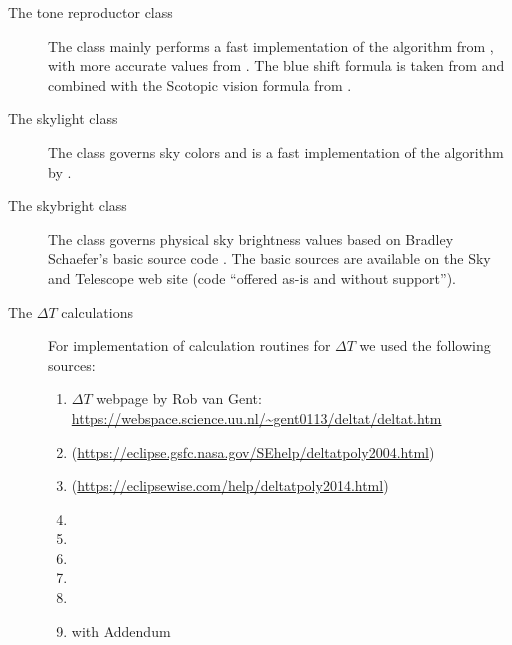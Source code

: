 \begin{description}
	\item[The tone reproductor class]
		The class mainly performs a fast implementation of the algorithm
		from \citet{TumblinRushmeier:1993}, with more accurate values from \citet{DevlinChalmersWilkie:2002}. 
		The blue shift formula is taken from \citet{WannJensen:2000} and combined with the Scotopic vision formula from  \citet{Larson:1997}.
	\item[The skylight class]
		The class governs sky colors and is a fast implementation of the algorithm by \citet{Preetham:1999}.
	\item[The skybright class]
		The class governs physical sky brightness values based on Bradley Schaefer's   basic source code \citep{Schaefer:1998}.
		The basic sources are available on the Sky and Telescope web site (code ``offered as-is and without support'').
	\item[The $\Delta T$ calculations]
		For implementation of calculation routines for $\Delta T$ we used the following sources:
		\begin{enumerate}
		\item $\Delta T$ webpage by Rob van Gent: \url{https://webspace.science.uu.nl/~gent0113/deltat/deltat.htm}
		\item {} (\url{https://eclipse.gsfc.nasa.gov/SEhelp/deltatpoly2004.html})
    \item {} (\url{https://eclipsewise.com/help/deltatpoly2014.html})
		\item {}
		\item {} %
		\item {} %
		\item {} %
		\item {} %
		\item {} %
		     with Addendum \citep{2005JHA....36..339M}

\end{enumerate}
\end{description}
